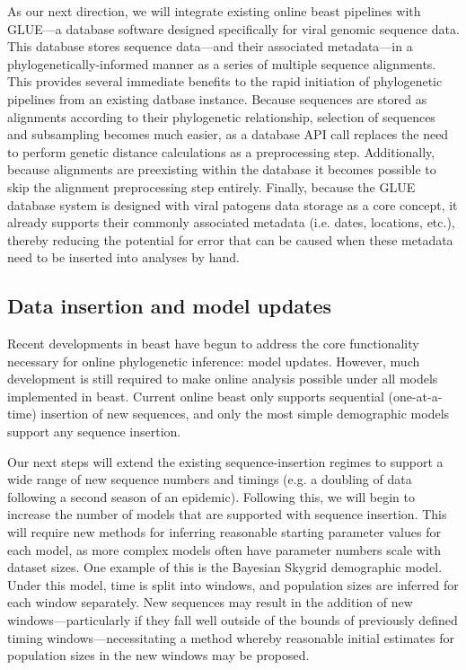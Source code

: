 As our next direction, we will integrate existing online \gls{beast} pipelines with GLUE\cite{glue}---a database software designed specifically for viral genomic sequence data.
This database stores sequence data---and their associated metadata---in a phylogenetically-informed manner as a series of multiple sequence alignments.
This provides several immediate benefits to the rapid initiation of phylogenetic pipelines from an existing datbase instance.
Because sequences are stored as alignments according to their phylogenetic relationship, selection of sequences and subsampling becomes much easier, as a database API call replaces the need to perform genetic distance calculations as a preprocessing step.
Additionally, because alignments are preexisting within the database it becomes possible to skip the alignment preprocessing step entirely.
Finally, because the GLUE database system is designed with viral patogens data storage as a core concept, it already supports their commonly associated metadata (i.e. dates, locations, etc.), thereby reducing the potential for error that can be caused when these metadata need to be inserted into analyses by hand.

\subsection{Data insertion and model updates}

Recent developments in \gls{beast} have begun to address the core functionality necessary for online phylogenetic inference: model updates\cite{gill2020online}.
However, much development is still required to make online analysis possible under all models implemented in \gls{beast}.
Current online \gls{beast} only supports sequential (one-at-a-time) insertion of new sequences, and only the most simple demographic models support any sequence insertion.

Our next steps will extend the existing sequence-insertion regimes to support a wide range of new sequence numbers and timings (e.g. a doubling of data following a second season of an epidemic).
Following this, we will begin to increase the number of models that are supported with sequence insertion.
This will require new methods for inferring reasonable starting parameter values for each model, as more complex models often have parameter numbers scale with dataset sizes.
One example of this is the Bayesian Skygrid demographic model.
Under this model, time is split into windows, and population sizes are inferred for each window separately.
New sequences may result in the addition of new windows---particularly if they fall well outside of the bounds of previously defined timing windows---necessitating a method whereby reasonable initial estimates for population sizes in the new windows may be proposed.

